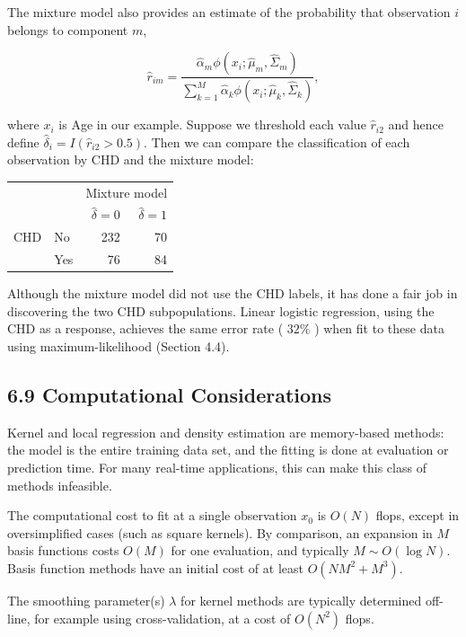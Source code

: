 \documentclass[10pt]{article}
\begin{document}
The mixture model also provides an estimate of the probability that observation $i$ belongs to component $m$,


\begin{equation*}
\hat{r}_{i m}=\frac{\hat{\alpha}_{m} \phi\left(x_{i} ; \hat{\mu}_{m}, \hat{\Sigma}_{m}\right)}{\sum_{k=1}^{M} \hat{\alpha}_{k} \phi\left(x_{i} ; \hat{\mu}_{k}, \hat{\Sigma}_{k}\right)}, \tag{6.33}
\end{equation*}


where $x_{i}$ is Age in our example. Suppose we threshold each value $\hat{r}_{i 2}$ and hence define $\hat{\delta}_{i}=I\left(\hat{r}_{i 2}>0.5\right)$. Then we can compare the classification of each observation by CHD and the mixture model:

\begin{center}
\begin{tabular}{ll|rr}
 &  & \multicolumn{2}{|c}{Mixture model} \\
 &  & $\hat{\delta}=0$ & $\hat{\delta}=1$ \\
\hline
CHD & No & 232 & 70 \\
 & Yes & 76 & 84 \\
\end{tabular}
\end{center}

Although the mixture model did not use the CHD labels, it has done a fair job in discovering the two CHD subpopulations. Linear logistic regression, using the CHD as a response, achieves the same error rate ( $32 \%$ ) when fit to these data using maximum-likelihood (Section 4.4).

\subsection*{6.9 Computational Considerations}
Kernel and local regression and density estimation are memory-based methods: the model is the entire training data set, and the fitting is done at evaluation or prediction time. For many real-time applications, this can make this class of methods infeasible.

The computational cost to fit at a single observation $x_{0}$ is $O(N)$ flops, except in oversimplified cases (such as square kernels). By comparison, an expansion in $M$ basis functions costs $O(M)$ for one evaluation, and typically $M \sim O(\log N)$. Basis function methods have an initial cost of at least $O\left(N M^{2}+M^{3}\right)$.

The smoothing parameter(s) $\lambda$ for kernel methods are typically determined off-line, for example using cross-validation, at a cost of $O\left(N^{2}\right)$ flops.
\end{document}
